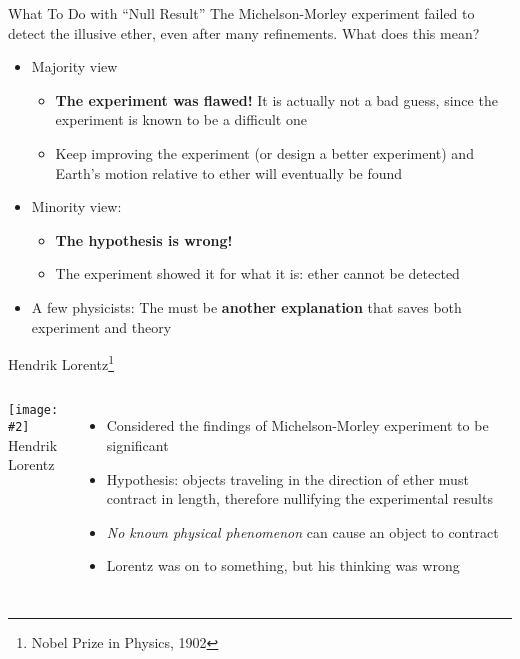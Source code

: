 \documentclass[12pt,compress,aspectratio=169]{beamer}
\newcommand{\pic}[2]{\texttt{[image: \#2]}}
\newcommand{\bigsqrt}{\ensuremath\sqrt{1-\left(\frac{v}{c}\right)^2}}
\newcommand{\lorentz}{\ensuremath\frac{1}{\bigsqrt}}
\newcommand{\eq}[2]{\vspace{#1}{\Large\begin{displaymath}#2\end{displaymath}}}
\begin{document}
\begin{frame}{What To Do with ``Null Result''}
  The Michelson-Morley experiment failed to detect the illusive ether, even
  after many refinements. What does this mean?
  \begin{itemize}
  \item Majority view
    \begin{itemize}
    \item\textbf{The experiment was flawed!} It is actually not a bad guess,
      since the experiment is known to be a difficult one
    \item Keep improving the experiment (or design a better experiment) and
      Earth's motion relative to ether will eventually be found
    \end{itemize}
  \item Minority view:
    \begin{itemize}
    \item\textbf{The hypothesis is wrong!}
    \item The experiment showed it for what it is: ether cannot be detected
    \end{itemize}
  \item A few physicists: The must be \textbf{another explanation} that saves
    both experiment and theory
  \end{itemize}
\end{frame}



\begin{frame}{Hendrik Lorentz\footnote{Nobel Prize in Physics, 1902}}
  \begin{columns}
    
    \begin{center}
      \pic{1.2}{graphics/lorentz.jpg}\\
          {\footnotesize Hendrik Lorentz}
    \end{center}
    
    \begin{itemize}
    \item Considered the findings of Michelson-Morley experiment to be
      significant
    \item Hypothesis: objects traveling in the direction of ether must
      contract in length, therefore nullifying the experimental results
      
      \eq{-.3in}{
        \boxed{\gamma=\lorentz}
      }
    \item\emph{No known physical phenomenon} can cause an object to contract
    \item Lorentz was on to something, but his thinking was wrong
    \end{itemize}
  \end{columns}
\end{frame}
\end{document}
